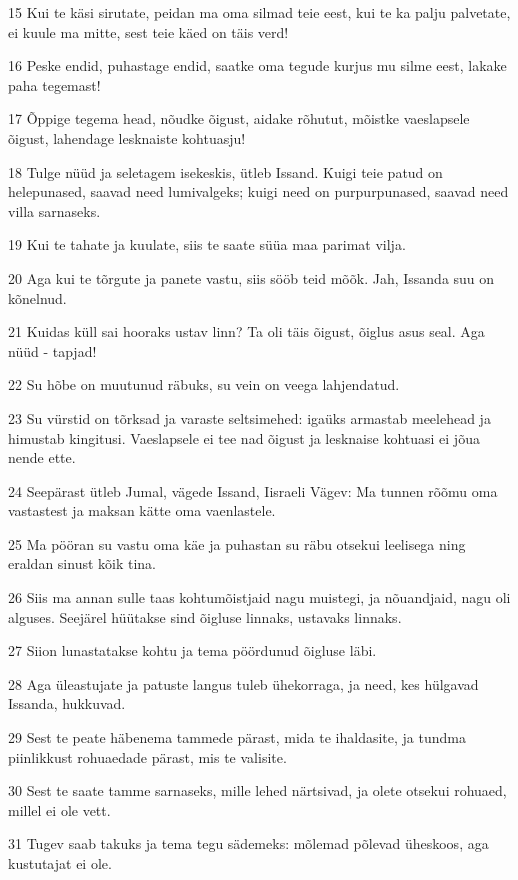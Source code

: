 \par 15 Kui te käsi sirutate, peidan ma oma silmad teie eest, kui te ka palju palvetate, ei kuule ma mitte, sest teie käed on täis verd!
\par 16 Peske endid, puhastage endid, saatke oma tegude kurjus mu silme eest, lakake paha tegemast!
\par 17 Õppige tegema head, nõudke õigust, aidake rõhutut, mõistke vaeslapsele õigust, lahendage lesknaiste kohtuasju!
\par 18 Tulge nüüd ja seletagem isekeskis, ütleb Issand. Kuigi teie patud on helepunased, saavad need lumivalgeks; kuigi need on purpurpunased, saavad need villa sarnaseks.
\par 19 Kui te tahate ja kuulate, siis te saate süüa maa parimat vilja.
\par 20 Aga kui te tõrgute ja panete vastu, siis sööb teid mõõk. Jah, Issanda suu on kõnelnud.
\par 21 Kuidas küll sai hooraks ustav linn? Ta oli täis õigust, õiglus asus seal. Aga nüüd - tapjad!
\par 22 Su hõbe on muutunud räbuks, su vein on veega lahjendatud.
\par 23 Su vürstid on tõrksad ja varaste seltsimehed: igaüks armastab meelehead ja himustab kingitusi. Vaeslapsele ei tee nad õigust ja lesknaise kohtuasi ei jõua nende ette.
\par 24 Seepärast ütleb Jumal, vägede Issand, Iisraeli Vägev: Ma tunnen rõõmu oma vastastest ja maksan kätte oma vaenlastele.
\par 25 Ma pööran su vastu oma käe ja puhastan su räbu otsekui leelisega ning eraldan sinust kõik tina.
\par 26 Siis ma annan sulle taas kohtumõistjaid nagu muistegi, ja nõuandjaid, nagu oli alguses. Seejärel hüütakse sind õigluse linnaks, ustavaks linnaks.
\par 27 Siion lunastatakse kohtu ja tema pöördunud õigluse läbi.
\par 28 Aga üleastujate ja patuste langus tuleb ühekorraga, ja need, kes hülgavad Issanda, hukkuvad.
\par 29 Sest te peate häbenema tammede pärast, mida te ihaldasite, ja tundma piinlikkust rohuaedade pärast, mis te valisite.
\par 30 Sest te saate tamme sarnaseks, mille lehed närtsivad, ja olete otsekui rohuaed, millel ei ole vett.
\par 31 Tugev saab takuks ja tema tegu sädemeks: mõlemad põlevad üheskoos, aga kustutajat ei ole.

